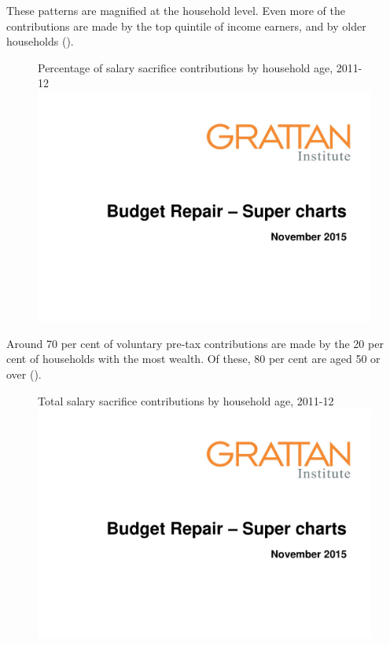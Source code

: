 \begin{subappendices}
\begin{figure}
\end{figure}

These patterns are magnified at the household level. Even more of the contributions are made by the top quintile of income earners, and by older households ().

\begin{figure}
%
{Percentage of salary sacrifice contributions by household age, 2011-12}\label{fig:SUPER-A-3}
\includegraphics[width=\columnwidth,page=37]{super-atlas/PPTX.pdf}

\end{figure}

Around 70 per cent of voluntary pre-tax contributions are made by the 20 per cent of households with the most wealth. Of these, 80 per cent are aged 50 or over (). 

\begin{figure}
%
{Total salary sacrifice contributions by household age, 2011-12}\label{fig:SUPER-A-4}
\includegraphics[width=\columnwidth,page=38]{super-atlas/PPTX.pdf}


\end{figure}
\end{subappendices}
